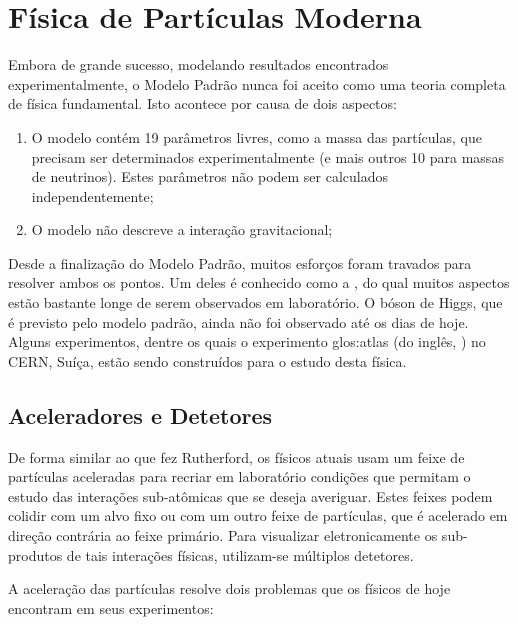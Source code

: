 \section{Física de Partículas Moderna}

Embora de grande sucesso, modelando resultados encontrados
ex\-pe\-ri\-men\-tal\-men\-te, o Modelo Pa\-drão nunca foi aceito como uma
teoria completa de física fundamental. Isto acontece por causa de dois
aspectos:

\begin{enumerate}
\item O modelo contém 19 parâmetros livres, como a massa das partículas, que
  precisam ser determinados experimentalmente (e mais outros 10 para massas de
  neutrinos). Estes parâmetros não podem ser calculados independentemente;

\item O modelo não descreve a interação gravitacional;
\end{enumerate}

Desde a finalização do Modelo Padrão, muitos esforços foram travados para
resolver ambos os pontos. Um deles é conhecido como a ,
do qual muitos aspectos estão bastante longe de serem observados em
laboratório. O bóson de Higgs, que é previsto pelo modelo padrão, ainda não
foi observado até os dias de hoje. Alguns experimentos, dentre os quais o
experimento \gls{glos:atlas} (do inglês, ) no
CERN, Suíça, estão sendo construídos para o estudo desta física.

\subsection{Aceleradores e Detetores}

De forma similar ao que fez Rutherford, os físicos atuais usam um feixe de
partículas aceleradas para recriar em laboratório condições que permitam o
estudo das interações sub-atômicas que se deseja averiguar. Estes feixes podem
colidir com um alvo fixo ou com um outro feixe de partículas, que é acelerado
em direção contrária ao feixe primário. Para visualizar eletronicamente os
sub-produtos de tais interações físicas, utilizam-se múltiplos detetores.

A aceleração das partículas resolve dois problemas que os físicos de hoje
encontram em seus experimentos:

